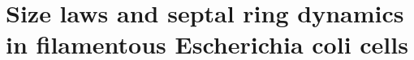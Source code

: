 

\chapter{Size laws and septal ring dynamics in filamentous Escherichia coli cells}
\label{chapter:filarecovery}
